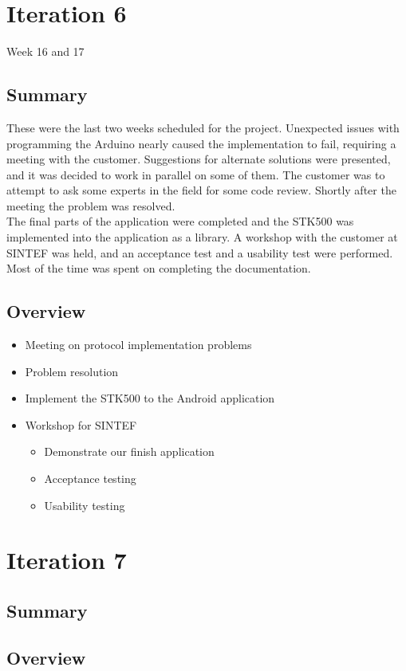 \section{Iteration 6}
Week 16 and 17

\subsection{Summary}
	These were the last two weeks scheduled for the project. Unexpected issues with programming the Arduino nearly caused the implementation to fail, requiring a meeting with the customer.
Suggestions for alternate solutions were presented, and it was decided to work in parallel on some of them. The customer was to attempt to ask some experts in the field for some code review.
Shortly after the meeting the problem was resolved.\\

The final parts of the application were completed and the STK500 was implemented into the application as a library.
	A workshop with the customer at SINTEF was held, and an acceptance test and a usability test were performed. Most of the time was spent on completing the documentation.

\subsection{Overview}
\begin{itemize}
    \item{Meeting on protocol implementation problems}
    \item{Problem resolution}
	\item{Implement the STK500 to the Android application}
	\item{Workshop for SINTEF}
		\begin{itemize}
		\item{Demonstrate our finish application}
		\item{Acceptance testing}
		\item{Usability testing}
	\end{itemize}
\end{itemize}

\section{Iteration 7}

\subsection{Summary}

\subsection{Overview}
